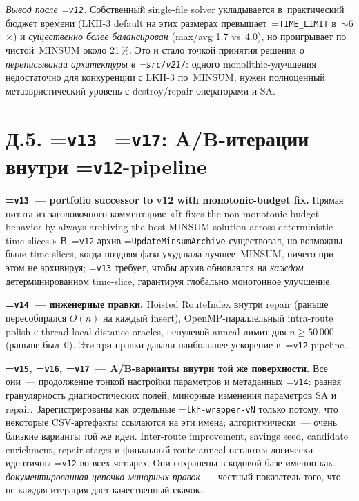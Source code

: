 \documentclass[a4paper,14pt]{extreport}
\makeatletter
\let\old@texttt\texttt
\renewcommand{\texttt}[1]{{\sloppy\hyphenchar\font=\m@ne\old@texttt{#1}}}
\makeatother
\begin{document}
\textit{Вывод после \texttt{v12}.} Собственный single-file solver укладывается в~практический бюджет времени (LKH-3 default на этих размерах превышает~\texttt{TIME\_LIMIT} в~$\sim$6$\times$) и \emph{существенно более балансирован} (max/avg 1.7 vs~4.0), но проигрывает по чистой~MINSUM около 21\,\%. Это и стало точкой принятия решения о \emph{переписывании архитектуры в \texttt{src/v21/}}: одного monolithic-улучшения недостаточно для конкуренции с LKH-3 по~MINSUM, нужен полноценный метаэвристический уровень с destroy/repair-операторами и SA.

\section*{Д.5. \texttt{v13}\,--\,\texttt{v17}: A/B-итерации внутри \texttt{v12}-pipeline}

\textbf{\texttt{v13}~--- portfolio successor to v12 with monotonic-budget fix.} Прямая цитата из заголовочного комментария: «It fixes the non-monotonic budget behavior by always archiving the best MINSUM solution across deterministic time slices.» В~\texttt{v12} архив \texttt{UpdateMinsumArchive} существовал, но возможны были time-slices, когда поздняя фаза ухудшала лучшее~MINSUM, ничего при этом не архивируя; \texttt{v13} требует, чтобы архив обновлялся на \emph{каждом} детерминированном time-slice, гарантируя глобально монотонное улучшение.

\textbf{\texttt{v14}~--- инженерные правки.} Hoisted RouteIndex внутри repair (раньше пересобирался $O(n)$ на каждый insert), OpenMP-параллельный intra-route polish с thread-local distance oracles, ненулевой anneal-лимит для $n \geq 50\,000$ (раньше был~0). Эти три правки давали наибольшее ускорение в~\texttt{v12}-pipeline.

\textbf{\texttt{v15}, \texttt{v16}, \texttt{v17}~--- A/B-варианты внутри той же поверхности.} Все они~--- продолжение тонкой настройки параметров и метаданных \texttt{v14}: разная гранулярность диагностических полей, минорные изменения параметров SA и repair. Зарегистрированы как отдельные \texttt{lkh-wrapper-vN} только потому, что некоторые CSV-артефакты ссылаются на эти имена; алгоритмически~--- очень близкие варианты той же идеи. Inter-route improvement, savings seed, candidate enrichment, repair stages и финальный route anneal остаются логически идентичны \texttt{v12} во всех четырех. Они сохранены в кодовой базе именно как \emph{документированная цепочка минорных правок}~--- честный показатель того, что не каждая итерация дает качественный скачок.
\end{document}

